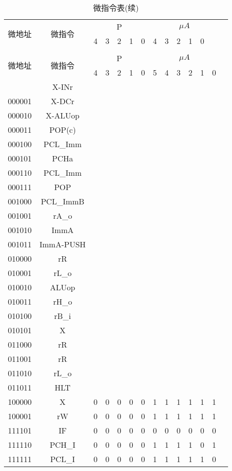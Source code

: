 \documentclass[10pt]{book}
\begin{document}
\begin{landscape}
\begin{longtable}{|c|c|c|c|c|c|c|c|c|c|c|c|c|c|}
\caption{微指令表} \label{tb_micro_prog2} \\
\hline
\multirow{2}{1.5cm}{微地址} & \multirow{2}{1.5cm}{微指令} & \multicolumn{5}{c|}{P} & \multicolumn {6}{c|}{$\mu A$} \\
\cline{3-13}
                          &           & 4 & 3 & 2 & 1 & 0 & 4 & 3 & 2 & 1 & 0 \\
\hline
\endfirsthead
\caption{微指令表(续)} \\
\hline
\multirow{2}{1.5cm}{微地址} & \multirow{2}{1.5cm}{微指令} & \multicolumn{5}{c|}{P} & \multicolumn {6}{c|}{$\mu A$} \\
\cline{3-13}
                          &           & 4 & 3 & 2 & 1 & 0 & 5 & 4 & 3 & 2 & 1 & 0 \\
\hline
\endhead
\hline
\endfoot
000000 & X-INr 		& \\
000001 & X-DCr 		& \\
000010 & X-ALUop 	& \\
000011 & POP(c) 	& \\
000100 & PCL\_Imm 	& \\
000101 & PCHa 		& \\
000110 & PCL\_Imm 	& \\
000111 & POP 		& \\
\hline
001000 & PCL\_ImmB	& \\
001001 & rA\_o		& \\
001010 & ImmA		& \\
001011 & ImmA-PUSH	& \\ 
\hline
010000 & rR		& \\
010001 & rL\_o		& \\
010010 & ALUop		& \\
010011 & rH\_o		& \\
010100 & rB\_i 		& \\
010101 & X 		& \\
\hline
011000 & rR		& \\
011001 & rR		& \\
011010 & rL\_o		& \\
011011 & HLT		& \\
\hline
100000 & X 		& 0 & 0 & 0 & 0 & 0 & 1 & 1 & 1 & 1 & 1 & 1 \\
100001 & rW		& 0 & 0 & 0 & 0 & 0 & 1 & 1 & 1 & 1 & 1 & 1 \\
111101 & IF		& 0 & 0 & 0 & 0 & 0 & 0 & 0 & 0 & 0 & 0 & 0 \\
111110 & PCH\_I 	& 0 & 0 & 0 & 0 & 0 & 1 & 1 & 1 & 1 & 0 & 1 \\
111111 & PCL\_I 	& 0 & 0 & 0 & 0 & 0 & 1 & 1 & 1 & 1 & 1 & 0 \\
\end{longtable}
\end{landscape}
\end{document}
